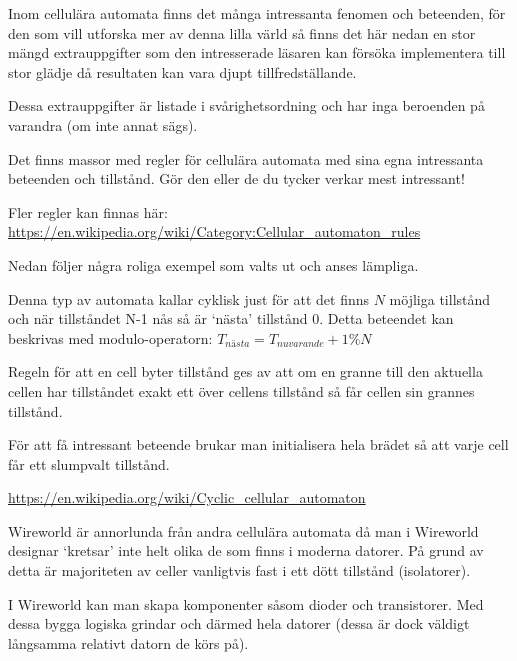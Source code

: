 Inom cellulära automata finns det många intressanta fenomen och beteenden,
för den som vill utforska mer av denna lilla värld så finns det här nedan en stor mängd extrauppgifter som den
intresserade läsaren kan försöka implementera till stor glädje då resultaten kan vara djupt tillfredställande.

Dessa extrauppgifter är listade i svårighetsordning och har inga beroenden på varandra (om inte annat sägs).



    Det finns massor med regler för cellulära automata med sina egna intressanta beteenden och tillstånd.
    Gör den eller de du tycker verkar mest intressant!

    Fler regler kan finnas här: \url{https://en.wikipedia.org/wiki/Category:Cellular_automaton_rules}

    Nedan följer några roliga exempel som valts ut och anses lämpliga.


        Denna typ av automata kallar cyklisk just för att det finns $N$ möjliga tillstånd och när tillståndet N-1 nås så är `nästa' tillstånd $0$.
        Detta beteendet kan beskrivas med modulo-operatorn: $T_{nästa} = T_{nuvarande} + 1 \% N$

        Regeln för att en cell byter tillstånd ges av att om en granne till den aktuella cellen har tillståndet exakt ett över cellens tillstånd så får cellen sin grannes tillstånd.

        För att få intressant beteende brukar man initialisera hela brädet så att varje cell får ett slumpvalt tillstånd.

        \url{https://en.wikipedia.org/wiki/Cyclic_cellular_automaton}


        Wireworld är annorlunda från andra cellulära automata då man i Wireworld designar `kretsar' inte helt olika de som finns i moderna datorer.
        På grund av detta är majoriteten av celler vanligtvis fast i ett dött tillstånd (isolatorer).

        I Wireworld kan man skapa komponenter såsom dioder och transistorer. Med dessa bygga logiska grindar och därmed hela datorer (dessa är dock väldigt långsamma relativt datorn de körs på).

